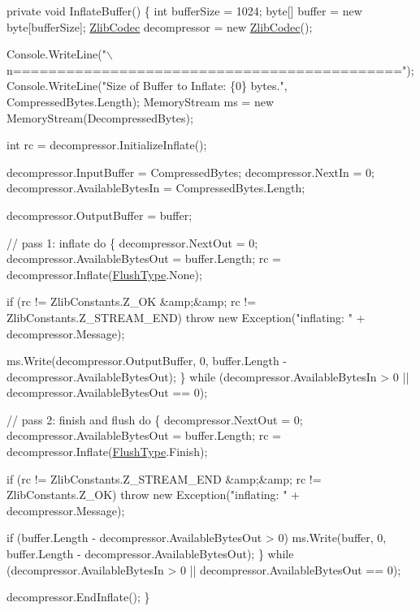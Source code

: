 \begin{DoxyCode}
\textcolor{keyword}{private} \textcolor{keywordtype}{void} InflateBuffer()
\{
    \textcolor{keywordtype}{int} bufferSize = 1024;
    byte[] buffer = \textcolor{keyword}{new} byte[bufferSize];
    \mbox{\hyperlink{class_super_tiled2_unity_1_1_ionic_1_1_zlib_1_1_zlib_codec_afb741f3d8822709c3fe17ff284d537ab}{ZlibCodec}} decompressor = \textcolor{keyword}{new} \mbox{\hyperlink{class_super_tiled2_unity_1_1_ionic_1_1_zlib_1_1_zlib_codec_afb741f3d8822709c3fe17ff284d537ab}{ZlibCodec}}();

    Console.WriteLine(\textcolor{stringliteral}{"\(\backslash\)n============================================"});
    Console.WriteLine(\textcolor{stringliteral}{"Size of Buffer to Inflate: \{0\} bytes."}, CompressedBytes.Length);
    MemoryStream ms = \textcolor{keyword}{new} MemoryStream(DecompressedBytes);

    \textcolor{keywordtype}{int} rc = decompressor.InitializeInflate();

    decompressor.InputBuffer = CompressedBytes;
    decompressor.NextIn = 0;
    decompressor.AvailableBytesIn = CompressedBytes.Length;

    decompressor.OutputBuffer = buffer;

    \textcolor{comment}{// pass 1: inflate }
    \textcolor{keywordflow}{do}
    \{
        decompressor.NextOut = 0;
        decompressor.AvailableBytesOut = buffer.Length;
        rc = decompressor.Inflate(\mbox{\hyperlink{namespace_super_tiled2_unity_1_1_ionic_1_1_zlib_a2c5853fd63f03c83ac2458da1f4ff3bc}{FlushType}}.None);

        \textcolor{keywordflow}{if} (rc != ZlibConstants.Z\_OK &amp;&amp; rc != ZlibConstants.Z\_STREAM\_END)
            \textcolor{keywordflow}{throw} \textcolor{keyword}{new} Exception(\textcolor{stringliteral}{"inflating: "} + decompressor.Message);

        ms.Write(decompressor.OutputBuffer, 0, buffer.Length - decompressor.AvailableBytesOut);
    \}
    \textcolor{keywordflow}{while} (decompressor.AvailableBytesIn > 0 || decompressor.AvailableBytesOut == 0);

    \textcolor{comment}{// pass 2: finish and flush}
    \textcolor{keywordflow}{do}
    \{
        decompressor.NextOut = 0;
        decompressor.AvailableBytesOut = buffer.Length;
        rc = decompressor.Inflate(\mbox{\hyperlink{namespace_super_tiled2_unity_1_1_ionic_1_1_zlib_a2c5853fd63f03c83ac2458da1f4ff3bc}{FlushType}}.Finish);

        \textcolor{keywordflow}{if} (rc != ZlibConstants.Z\_STREAM\_END &amp;&amp; rc != ZlibConstants.Z\_OK)
            \textcolor{keywordflow}{throw} \textcolor{keyword}{new} Exception(\textcolor{stringliteral}{"inflating: "} + decompressor.Message);

        \textcolor{keywordflow}{if} (buffer.Length - decompressor.AvailableBytesOut > 0)
            ms.Write(buffer, 0, buffer.Length - decompressor.AvailableBytesOut);
    \}
    \textcolor{keywordflow}{while} (decompressor.AvailableBytesIn > 0 || decompressor.AvailableBytesOut == 0);

    decompressor.EndInflate();
\}
\end{DoxyCode}
 


